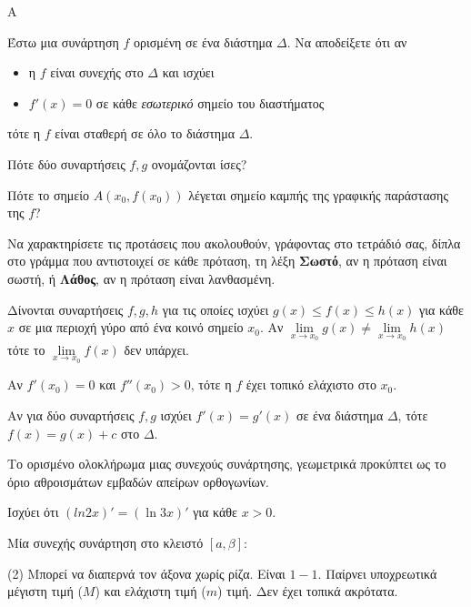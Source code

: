 \begin{thema}{A}
\begin{erwthma}
    \item Έστω μια συνάρτηση $ f $ ορισμένη σε ένα διάστημα $ \varDelta $. Να αποδείξετε ότι αν \begin{itemize} \item η $ f $ είναι συνεχής στο $ \varDelta $ και ισχύει \item $ f'(x)=0 $ σε κάθε \emph{εσωτερικό} σημείο του διαστήματος \end{itemize} τότε η $ f $ είναι σταθερή σε όλο το διάστημα $ \varDelta $.
    \item Πότε δύο συναρτήσεις $f, g$ ονομάζονται ίσες?
    \item Πότε το σημείο $A(x_0, f(x_0))$ λέγεται σημείο καμπής της γραφικής παράστασης της $f$?
    \item Να χαρακτηρίσετε τις προτάσεις που ακολουθούν, γράφοντας στο τετράδιό σας, δίπλα στο γράμμα που αντιστοιχεί σε κάθε πρόταση, τη λέξη \textbf{Σωστό}, αν η πρόταση είναι σωστή, ή \textbf{Λάθος}, αν η πρόταση είναι λανθασμένη.
    \begin{alist}
        \item Δίνονται συναρτήσεις $f,g,h$ για τις οποίες ισχύει $g(x)\leq f(x)\leq h(x)$ για κάθε $x$ σε μια περιοχή γύρο από ένα κοινό σημείο $x_0$. Αν $\lim\limits_{x\to x_0}{g(x)}\neq\lim\limits_{x\to x_0}{h(x)}$ τότε το $\lim\limits_{x\to x_0}{f(x)}$ δεν υπάρχει.
        \item Αν $f'(x_0) = 0$ και $f''(x_0) > 0$, τότε η $f$ έχει τοπικό ελάχιστο στο $x_0$.
        \item Αν για δύο συναρτήσεις $f,g$ ισχύει $f'(x) = g'(x)$ σε ένα διάστημα $\Delta$, τότε $f(x) = g(x) + c$ στο $\Delta$.
        \item Το ορισμένο ολοκλήρωμα μιας συνεχούς συνάρτησης, γεωμετρικά προκύπτει ως το όριο αθροισμάτων εμβαδών απείρων ορθογωνίων.
        \item Ισχύει ότι $\left(ln{2x}\right)'=\left(\ln{3x}\right)'$ για κάθε $x>0$.
    \end{alist}
    \item Μία συνεχής συνάρτηση στο κλειστό $[a, \beta]$:
    \begin{tasks}[label=\let\textdexiakeraia\relax\alph*.](2)
        \task Μπορεί να διαπερνά τον άξονα χωρίς ρίζα.
        \task Είναι $1-1$.
        \task Παίρνει υποχρεωτικά μέγιστη τιμή ($Μ$) και ελάχιστη τιμή ($m$) τιμή.
        \task Δεν έχει τοπικά ακρότατα.
    \end{tasks}
\end{erwthma}
\end{thema}


